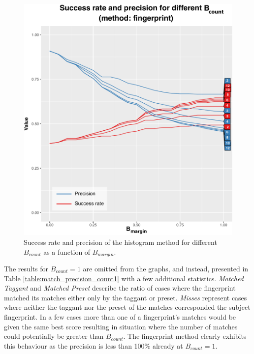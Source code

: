 \documentclass[thesis.tex]{subfiles}
\begin{document}
\begin{figure}
\centering \includegraphics[page=2,width=\textwidth,height=\textheight,keepaspectratio=true]{images/experiment/match_precision}
\caption{Success rate and precision of the histogram method for different $B_{count}$ as a function of $B_{margin}$.}
\label{figure:match_precision_histogram}
\end{figure}

\clearpage

The results for $B_{count}=1$ are omitted from the graphs, and instead, presented in Table \ref{table:match_precision_count1} with a few additional statistics. \emph{Matched Taggant} and \emph{Matched Preset} describe the ratio of cases where the fingerprint matched its matches either only by the taggant or preset. \emph{Misses} represent cases where neither the taggant nor the preset of the matches corresponded the subject fingerprint. In a few cases more than one of a fingerprint's matches would be given the same best score resulting in situation where the number of matches could potentially be greater than $B_{count}$. The fingerprint method clearly exhibits this behaviour as the precision is less than 100\% already at $B_{count}=1$.
\end{document}
